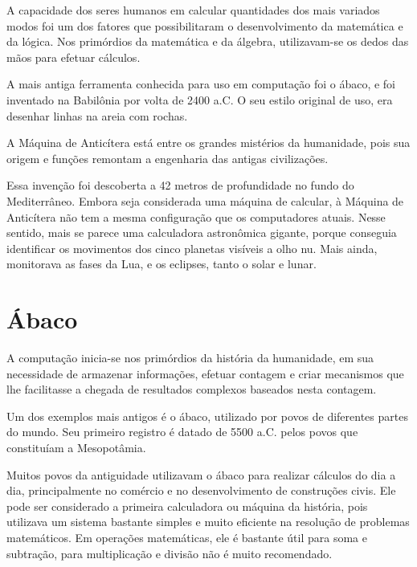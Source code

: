 \documentclass[
	12pt,				%
	openright,			%
	twoside,			%
	a4paper,			%
	english,			%
	french,				%
	spanish,			%
	brazil,				%
	]{abntex2}
\begin{document}
A capacidade dos seres humanos em calcular quantidades dos mais variados modos foi um dos fatores que possibilitaram o desenvolvimento da matemática e da lógica. Nos primórdios da matemática e da álgebra, utilizavam-se os dedos das mãos para efetuar cálculos.
\par
A mais antiga ferramenta conhecida para uso em computação foi o ábaco, e foi inventado na Babilônia por volta de 2400 a.C. O seu estilo original de uso, era desenhar linhas na areia com rochas.
\par
A Máquina de Anticítera está entre os grandes mistérios da humanidade, pois sua origem e funções remontam a engenharia das antigas civilizações.
\par
Essa invenção foi descoberta a 42 metros de profundidade no fundo do Mediterrâneo. Embora seja considerada uma máquina de calcular, à Máquina de Anticítera não tem a mesma configuração que os computadores atuais. Nesse sentido, mais se parece uma calculadora astronômica gigante, porque conseguia identificar os movimentos dos cinco planetas visíveis a olho nu. Mais ainda, monitorava as fases da Lua, e os eclipses, tanto o solar e lunar.

\chapter{Ábaco}
A computação inicia-se nos primórdios da história da humanidade, em sua necessidade de armazenar informações, efetuar contagem e criar mecanismos que lhe facilitasse a chegada de resultados complexos baseados nesta contagem.
\par
Um dos exemplos mais antigos é o ábaco, utilizado por povos de diferentes partes do mundo. Seu primeiro registro é datado de 5500 a.C. pelos povos que constituíam a Mesopotâmia.
\par
Muitos povos da antiguidade utilizavam o ábaco para realizar cálculos do dia a dia, principalmente no comércio e no desenvolvimento de construções civis. Ele pode ser considerado a primeira calculadora ou máquina da história, pois utilizava um sistema bastante simples e muito eficiente na resolução de problemas matemáticos. Em operações matemáticas, ele é bastante útil para soma e subtração, para multiplicação e divisão não é muito recomendado.

\end{document}
